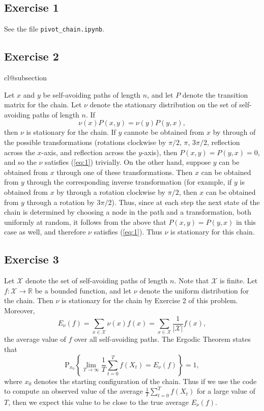 \documentclass[12pt]{article}
\makeatletter
\def\nullstepcounter#1{%
	\begingroup
		\let\@elt\@stpelt
		\csname cl@#1\endcsname
	\endgroup}
\newcommand{\Prob}{\mathrm{P}}
\makeatother
\begin{document}
\subsection*{Exercise 1}

See the file \texttt{pivot\_chain.ipynb}.

\subsection*{Exercise 2}
\nullstepcounter{subsection}

Let $x$ and $y$ be self-avoiding paths of length $n$, and let $P$ denote the transition matrix for the chain. Let $\nu$ denote the stationary distribution on the set of self-avoiding paths of length $n$. If
\begin{equation} \label{eq:1}
\nu(x) P(x, y) = \nu(y) P(y, x),
\end{equation}
then $\nu$ is stationary for the chain. If $y$ cannote be obtained from $x$ by through of the possible transformations (rotations clockwise by $\pi/2$, $\pi$, $3\pi/2$, reflection across the $x$-axis, and reflection across the $y$-axis), then $P(x, y) = P(y, x) = 0$, and so the $\nu$ satisfies (\ref{eq:1}) trivially. On the other hand, suppose $y$ can be obtained from $x$ through one of these transformations. Then $x$ can be obtained from $y$ through the corresponding inverse transformation (for example, if $y$ is obtained from $x$ by through a rotation clockwise by $\pi/2$, then $x$ can be obtained from $y$ through a rotation by $3\pi/2$). Thus, since at each step the next state of the chain is determined by choosing a node in the path and a transformation, both uniformly at random, it follows from the above that $P(x, y) = P(y, x)$ in this case as well, and therefore $\nu$ satisfies (\ref{eq:1}). Thus $\nu$ is stationary for this chain.

\subsection*{Exercise 3}

Let $\mathcal{X}$ denote the set of self-avoiding paths of length $n$. Note that $\mathcal{X}$ is finite. Let $f : \mathcal{X} \to \mathbb{R}$ be a bounded function, and let $\nu$ denote the uniform distribution for the chain. Then $\nu$ is stationary for the chain by Exercise 2 of this problem. Moreover,
\begin{equation*}
E_\nu(f) = \sum_{x \in \mathcal{X}} \nu(x) f(x) = \sum_{x \in \mathcal{X}} \frac{1}{|\mathcal{X}|} f(x),
\end{equation*}
the average value of $f$ over all self-avoiding paths. The Ergodic Theorem states that
\begin{equation*}
\Prob_{x_0}\left\{\lim_{T \to \infty} \frac{1}{T} \sum_{t=0}^T f(X_t) = E_\nu(f)\right\} = 1,
\end{equation*}
where $x_0$ denotes the starting configuration of the chain. Thus if we use the code to compute an observed value of the average $\frac{1}{T} \sum_{t=0}^T f(X_t)$ for a large value of $T$, then we expect this value to be close to the true average $E_\nu(f)$.
\end{document}
